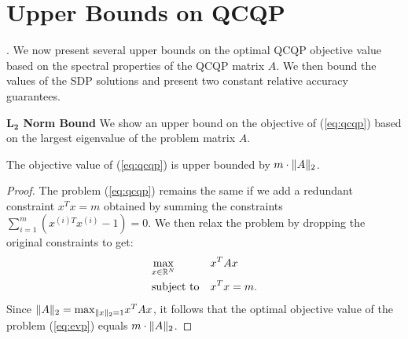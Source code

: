 \section{Upper Bounds on QCQP}\label{chap:relaxations:upperbounds}.
We now present several upper bounds on the optimal QCQP objective
value based on the spectral properties of the QCQP matrix $A$. We then bound the
values of the SDP solutions and present two constant relative accuracy
guarantees.

\noindent\textbf{$\mathbf{L_2}$ Norm Bound}
We show an  upper bound on the objective of (\ref{eq:qcqp}) based on the largest eigenvalue
of the problem matrix $A$.

\begin{proposition}
The objective value of (\ref{eq:qcqp}) is upper bounded by $m \cdot \lVert A\rVert_2$.
\end{proposition}
\begin{proof}
The problem (\ref{eq:qcqp}) remains the same if we add a redundant constraint $x^T x = m$
obtained by summing the constraints $\sum_{i= 1}^{m} \left(x^{(i)T}x^{(i)} - 1\right) = 0$.
We then relax the problem by dropping the original constraints to get:
\begin{equation}\label{eq:evp}
\begin{aligned}
& \underset{x \in \mathbb{R}^{N}}{\text{max}}
& & x^T A x\\
& \text{subject to}
& &x^{T} x = m.
\end{aligned}
\end{equation}
Since $\lVert A\rVert_2 = \text{max}_{\lVert x\rVert_2 = 1} x^T A x$, it follows that the optimal
objective value of the problem (\ref{eq:evp}) equals $m \cdot \lVert A\rVert_2 $.
\end{proof}

